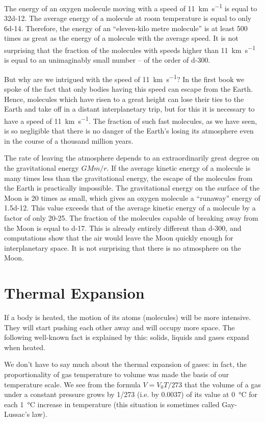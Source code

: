 The energy of an oxygen molecule moving with a speed of \SI{11}{\kilo\meter\per\second} is equal to \SI{32d-12}{\erg}. The average energy of a molecule at room temperature is equal to only \SI{6d-14}{\erg}. Therefore, the energy of an ``eleven-kilo­ metre molecule'' is at least 500 times as great as the ener­gy of a molecule with the average speed. It is not surpris­ing that the fraction of the molecules with speeds higher than \SI{11}{\kilo\meter\per\second} is equal to an unimaginably small number -- of the order of \num{d-300}.

But why are we intrigued with the speed of \SI{11}{\kilo\meter\per\second}? In the first book we spoke of the fact that only bodies having this speed can escape from the Earth. Hence, molecules which have risen to a great height can lose their ties to the Earth and take off in a distant interplane­tary trip, but for this it is necessary to have a speed of \SI{11}{\kilo\meter\per\second}. The fraction of such fast molecules, as we have seen, is so negligible that there is no danger of the Earth’s losing its atmosphere even in the course of a thousand million years.

The rate of leaving the atmosphere depends to an ex­traordinarily great degree on the gravitational energy $GMm/r$. If the average kinetic energy of a molecule is many times less than the gravitational energy, the escape of the molecules from the Earth is practically impos­sible. The gravitational energy on the surface of the Moon is 20 times as small, which gives an oxygen molecule a ``runaway'' energy of \SI{1.5d-12}{\erg}. This value exceeds that of the average kinetic energy of a molecule by a factor of only 20-25. The fraction of the molecules capable of breaking away from the Moon is equal to \num{d-17}. This is already entirely different than \num{d-300}, and computations show that the air would leave the Moon quickly enough for interplanetary space. It is not surprising that there is no atmosphere on the Moon.


\section{Thermal Expansion}

If a body is heated, the motion of its atoms (molecules) will be more intensive. They will start pushing each other away and will occupy more space. The following well-known fact is explained by this: solids, liquids and gases expand when heated.

We don’t have to say much about the thermal expansion of gases: in fact, the proportionality of gas temperature to volume was made the basis of our temperature scale.
We see from the formula $V = V_{0}T/273$ that the volume of a gas under a constant pressure grows by 1/273 (i.e. by 0.0037) of its value at \SI{0}{\celsius} for each \SI{1}{\celsius} increase in tem­perature (this situation is sometimes called Gay-Lussac’s law).

